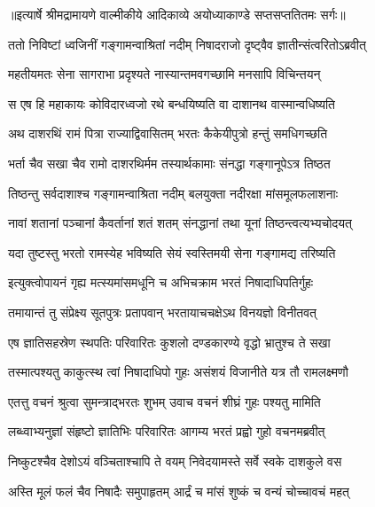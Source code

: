 {॥इत्यार्षे श्रीमद्रामायणे वाल्मीकीये आदिकाव्ये अयोध्याकाण्डे सप्तसप्ततितमः सर्गः॥}


\twolineshloka
{ततो निविष्टां ध्वजिनीं गङ्गामन्वाश्रितां नदीम्}
{निषादराजो दृष्ट्वैव ज्ञातीन्संत्वरितोऽब्रवीत्} %

\twolineshloka
{महतीयमतः सेना सागराभा प्रदृश्यते}
{नास्यान्तमवगच्छामि मनसापि विचिन्तयन्} %

\twolineshloka
{स एष हि महाकायः कोविदारध्वजो रथे}
{बन्धयिष्यति वा दाशानथ वास्मान्वधिष्यति} %

\twolineshloka
{अथ दाशरथिं रामं पित्रा राज्याद्विवासितम्}
{भरतः कैकेयीपुत्रो हन्तुं समधिगच्छति} %

\twolineshloka
{भर्ता चैव सखा चैव रामो दाशरथिर्मम}
{तस्यार्थकामाः संनद्धा गङ्गानूपेऽत्र तिष्ठत} %

\twolineshloka
{तिष्ठन्तु सर्वदाशाश्च गङ्गामन्वाश्रिता नदीम्}
{बलयुक्ता नदीरक्षा मांसमूलफलाशनाः} %

\twolineshloka
{नावां शतानां पञ्चानां कैवर्तानां शतं शतम्}
{संनद्धानां तथा यूनां तिष्ठन्त्वत्यभ्यचोदयत्} %

\twolineshloka
{यदा तुष्टस्तु भरतो रामस्येह भविष्यति}
{सेयं स्वस्तिमयी सेना गङ्गामद्य तरिष्यति} %

\twolineshloka
{इत्युक्त्वोपायनं गृह्य मत्स्यमांसमधूनि च}
{अभिचक्राम भरतं निषादाधिपतिर्गुहः} %

\twolineshloka
{तमायान्तं तु संप्रेक्ष्य सूतपुत्रः प्रतापवान्}
{भरतायाचचक्षेऽथ विनयज्ञो विनीतवत्} %

\twolineshloka
{एष ज्ञातिसहस्रेण स्थपतिः परिवारितः}
{कुशलो दण्डकारण्ये वृद्धो भ्रातुश्च ते सखा} %

\twolineshloka
{तस्मात्पश्यतु काकुत्स्थ त्वां निषादाधिपो गुहः}
{असंशयं विजानीते यत्र तौ रामलक्ष्मणौ} %

\twolineshloka
{एतत्तु वचनं श्रुत्वा सुमन्त्राद्भरतः शुभम्}
{उवाच वचनं शीघ्रं गुहः पश्यतु मामिति} %

\twolineshloka
{लब्ध्वाभ्यनुज्ञां संहृष्टो ज्ञातिभिः परिवारितः}
{आगम्य भरतं प्रह्वो गुहो वचनमब्रवीत्} %

\twolineshloka
{निष्कुटश्चैव देशोऽयं वञ्चिताश्चापि ते वयम्}
{निवेदयामस्ते सर्वे स्वके दाशकुले वस} %

\twolineshloka
{अस्ति मूलं फलं चैव निषादैः समुपाहृतम्}
{आर्द्रं च मांसं शुष्कं च वन्यं चोच्चावचं महत्} %

